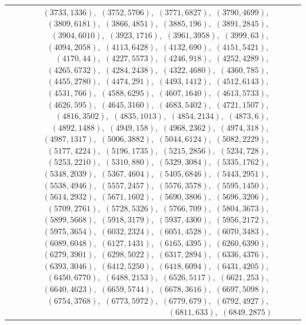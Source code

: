 \documentclass[11pt]{article}
\begin{document}
\begin{longtable}{@{}rrl>{\raggedright\arraybackslash}p{}@{}}
$(3733,1336)$,\allowbreak\ $(3752,5706)$,\allowbreak\ $(3771,6827)$,\allowbreak\ $(3790,4699)$,\allowbreak\ $(3809,6181)$,\allowbreak\ $(3866,4851)$,\allowbreak\ $(3885,196)$,\allowbreak\ $(3891,2845)$,\allowbreak\ $(3904,6010)$,\allowbreak\ $(3923,1716)$,\allowbreak\ $(3961,3958)$,\allowbreak\ $(3999,63)$,\allowbreak\ $(4094,2058)$,\allowbreak\ $(4113,6428)$,\allowbreak\ $(4132,690)$,\allowbreak\ $(4151,5421)$,\allowbreak\ $(4170,44)$,\allowbreak\ $(4227,5573)$,\allowbreak\ $(4246,918)$,\allowbreak\ $(4252,4289)$,\allowbreak\ $(4265,6732)$,\allowbreak\ $(4284,2438)$,\allowbreak\ $(4322,4680)$,\allowbreak\ $(4360,785)$,\allowbreak\ $(4455,2780)$,\allowbreak\ $(4474,291)$,\allowbreak\ $(4493,1412)$,\allowbreak\ $(4512,6143)$,\allowbreak\ $(4531,766)$,\allowbreak\ $(4588,6295)$,\allowbreak\ $(4607,1640)$,\allowbreak\ $(4613,5733)$,\allowbreak\ $(4626,595)$,\allowbreak\ $(4645,3160)$,\allowbreak\ $(4683,5402)$,\allowbreak\ $(4721,1507)$,\allowbreak\ $(4816,3502)$,\allowbreak\ $(4835,1013)$,\allowbreak\ $(4854,2134)$,\allowbreak\ $(4873,6)$,\allowbreak\ $(4892,1488)$,\allowbreak\ $(4949,158)$,\allowbreak\ $(4968,2362)$,\allowbreak\ $(4974,318)$,\allowbreak\ $(4987,1317)$,\allowbreak\ $(5006,3882)$,\allowbreak\ $(5044,6124)$,\allowbreak\ $(5082,2229)$,\allowbreak\ $(5177,4224)$,\allowbreak\ $(5196,1735)$,\allowbreak\ $(5215,2856)$,\allowbreak\ $(5234,728)$,\allowbreak\ $(5253,2210)$,\allowbreak\ $(5310,880)$,\allowbreak\ $(5329,3084)$,\allowbreak\ $(5335,1762)$,\allowbreak\ $(5348,2039)$,\allowbreak\ $(5367,4604)$,\allowbreak\ $(5405,6846)$,\allowbreak\ $(5443,2951)$,\allowbreak\ $(5538,4946)$,\allowbreak\ $(5557,2457)$,\allowbreak\ $(5576,3578)$,\allowbreak\ $(5595,1450)$,\allowbreak\ $(5614,2932)$,\allowbreak\ $(5671,1602)$,\allowbreak\ $(5690,3806)$,\allowbreak\ $(5696,3206)$,\allowbreak\ $(5709,2761)$,\allowbreak\ $(5728,5326)$,\allowbreak\ $(5766,709)$,\allowbreak\ $(5804,3673)$,\allowbreak\ $(5899,5668)$,\allowbreak\ $(5918,3179)$,\allowbreak\ $(5937,4300)$,\allowbreak\ $(5956,2172)$,\allowbreak\ $(5975,3654)$,\allowbreak\ $(6032,2324)$,\allowbreak\ $(6051,4528)$,\allowbreak\ $(6070,3483)$,\allowbreak\ $(6089,6048)$,\allowbreak\ $(6127,1431)$,\allowbreak\ $(6165,4395)$,\allowbreak\ $(6260,6390)$,\allowbreak\ $(6279,3901)$,\allowbreak\ $(6298,5022)$,\allowbreak\ $(6317,2894)$,\allowbreak\ $(6336,4376)$,\allowbreak\ $(6393,3046)$,\allowbreak\ $(6412,5250)$,\allowbreak\ $(6418,6094)$,\allowbreak\ $(6431,4205)$,\allowbreak\ $(6450,6770)$,\allowbreak\ $(6488,2153)$,\allowbreak\ $(6526,5117)$,\allowbreak\ $(6621,253)$,\allowbreak\ $(6640,4623)$,\allowbreak\ $(6659,5744)$,\allowbreak\ $(6678,3616)$,\allowbreak\ $(6697,5098)$,\allowbreak\ $(6754,3768)$,\allowbreak\ $(6773,5972)$,\allowbreak\ $(6779,679)$,\allowbreak\ $(6792,4927)$,\allowbreak\ $(6811,633)$,\allowbreak\ $(6849,2875)$\\

\end{longtable}
\end{document}
